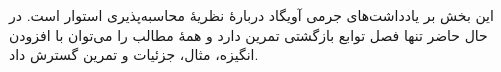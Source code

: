 \documentclass[../../include/open-logic-part]{subfiles}
\begin{document}

\begin{editorial}
  این بخش بر یادداشت‌های جرمی آویگاد دربارهٔ نظریهٔ محاسبه‌پذیری
  استوار است. در حال حاضر تنها فصل توابع بازگشتی تمرین دارد و همهٔ
  مطالب را می‌توان با افزودن انگیزه، مثال، جزئیات و تمرین گسترش داد.
\end{editorial}



\OLEndPartHook
\end{document}

